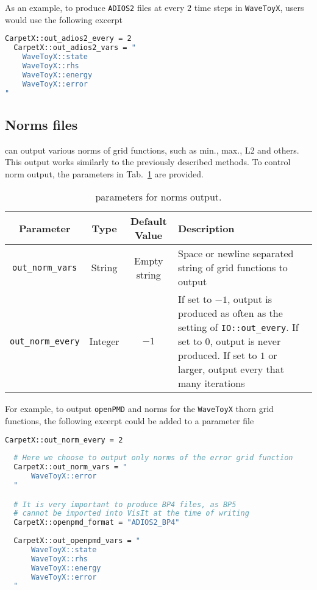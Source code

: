 As an example, to produce \texttt{ADIOS2} files at every $2$ time steps in \texttt{WaveToyX}, users would use the following excerpt

\begin{lstlisting}[language=bash]
  CarpetX::out_adios2_every = 2
  CarpetX::out_adios2_vars = "
    WaveToyX::state
    WaveToyX::rhs
    WaveToyX::energy
    WaveToyX::error
"
\end{lstlisting}

\subsection{Norms files}

\CarpetX can output various norms of grid functions, such as min., max., L2 and others. This output works similarly to the previously described methods. To control norm output, the parameters in Tab.~\ref{tab:norms_output} are provided.

\begin{table}[hb]
  \centering
  \begin{tabularx}{\textwidth}{cccX}
    Parameter                 & Type    & Default Value  & Description \\\hline\hline
    \texttt{out\_norm\_vars}  & String  & Empty string   & Space or newline separated string of grid functions to output \\
    \texttt{out\_norm\_every} & Integer & $-1$           & If set to $-1$, output is produced as often as the setting of \texttt{IO::out\_every}. If set to $0$, output is never produced. If set to $1$ or larger, output every that many iterations \\\hline\hline
  \end{tabularx}
  \label{tab:norms_output}
  \caption{\CarpetX\space parameters for norms output.}
\end{table}

For example, to output \texttt{openPMD} and norms for the \texttt{WaveToyX} thorn grid functions, the following excerpt could be added to a parameter file

\begin{lstlisting}[language=bash]
  CarpetX::out_norm_every = 2
  
  # Here we choose to output only norms of the error grid function    
  CarpetX::out_norm_vars = "
      WaveToyX::error
  "

  # It is very important to produce BP4 files, as BP5
  # cannot be imported into VisIt at the time of writing
  CarpetX::openpmd_format = "ADIOS2_BP4"
  
  CarpetX::out_openpmd_vars = "
      WaveToyX::state
      WaveToyX::rhs
      WaveToyX::energy
      WaveToyX::error
  "
\end{lstlisting}

